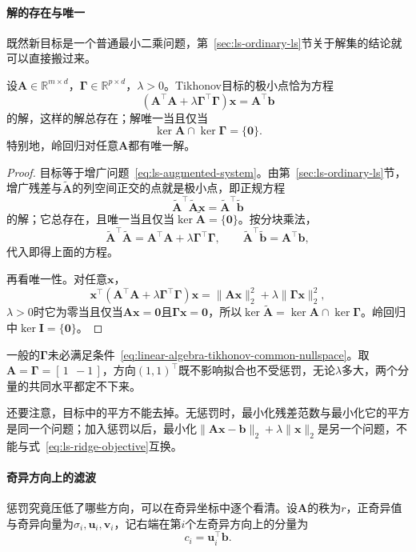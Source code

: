 \paragraph{解的存在与唯一}
既然新目标是一个普通最小二乘问题，第~\ref{sec:ls-ordinary-ls}节关于解集的结论就可以直接搬过来。

\begin{theorem}[Tikhonov解的存在与唯一]
\label{thm:ls-tikhonov-existence-uniqueness}
设$\bm A\in\mathbb R^{m\times d}$，$\bm\Gamma\in\mathbb R^{p\times d}$，$\lambda>0$。Tikhonov目标的极小点恰为方程
\begin{equation}
 (\bm A^\top\bm A+\lambda\bm\Gamma^\top\bm\Gamma)\bm x=\bm A^\top\bm b
 \label{eq:ls-tikhonov-normal-equation}
\end{equation}
的解，这样的解总存在；解唯一当且仅当
\begin{equation}
 \ker\bm A\cap\ker\bm\Gamma=\{\bm0\}.
 \label{eq:linear-algebra-tikhonov-common-nullspace}
\end{equation}
特别地，岭回归对任意$\bm A$都有唯一解。
\end{theorem}
\begin{proof}
目标等于增广问题~\eqref{eq:ls-augmented-system}。由第~\ref{sec:ls-ordinary-ls}节，增广残差与$\tilde{\bm A}$的列空间正交的点就是极小点，即正规方程
\[
 \tilde{\bm A}^\top\tilde{\bm A}\bm x=\tilde{\bm A}^\top\tilde{\bm b}
\]
的解；它总存在，且唯一当且仅当$\ker\tilde{\bm A}=\{\bm0\}$。按分块乘法，
\[
 \tilde{\bm A}^\top\tilde{\bm A}=\bm A^\top\bm A+\lambda\bm\Gamma^\top\bm\Gamma,\qquad \tilde{\bm A}^\top\tilde{\bm b}=\bm A^\top\bm b ,
\]
代入即得上面的方程。

再看唯一性。对任意$\bm x$，
\[
 \bm x^\top(\bm A^\top\bm A+\lambda\bm\Gamma^\top\bm\Gamma)\bm x=\lVert\bm A\bm x\rVert_2^2+\lambda\lVert\bm\Gamma\bm x\rVert_2^2 ,
\]
$\lambda>0$时它为零当且仅当$\bm A\bm x=\bm0$且$\bm\Gamma\bm x=\bm0$，所以$\ker\tilde{\bm A}=\ker\bm A\cap\ker\bm\Gamma$。岭回归中$\ker\bm I=\{\bm0\}$。
\end{proof}

一般的$\bm\Gamma$未必满足条件~\eqref{eq:linear-algebra-tikhonov-common-nullspace}。取$\bm A=\bm\Gamma=[\,1\ \ -1\,]$，方向$(1,1)^\top$既不影响拟合也不受惩罚，无论$\lambda$多大，两个分量的共同水平都定不下来。

还要注意，目标中的平方不能去掉。无惩罚时，最小化残差范数与最小化它的平方是同一个问题；加入惩罚以后，最小化$\lVert\bm A\bm x-\bm b\rVert_2+\lambda\lVert\bm x\rVert_2$是另一个问题，不能与式~\eqref{eq:ls-ridge-objective}互换。

\paragraph{奇异方向上的滤波}
惩罚究竟压低了哪些方向，可以在奇异坐标中逐个看清。设$\bm A$的秩为$r$，正奇异值与奇异向量为$\sigma_i,\bm u_i,\bm v_i$，记右端在第$i$个左奇异方向上的分量为
\begin{equation}
 c_i=\bm u_i^\top\bm b .
 \label{eq:ls-rhs-singular-coefficients}
\end{equation}

